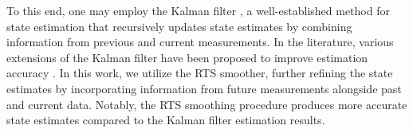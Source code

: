 To this end, one may employ the Kalman filter \cite{kalman1960new}, a well-established method for state estimation that recursively updates state estimates by combining information from previous and current measurements. In the literature, various extensions of the Kalman filter have been proposed to improve estimation accuracy \cite{julier2004unscented,julier1995new}. 
%
In this work, we utilize the RTS smoother, further refining the state estimates by incorporating information from future measurements alongside past and current data.
%
Notably, the RTS smoothing procedure produces more accurate state estimates compared to the Kalman filter estimation results.
%
